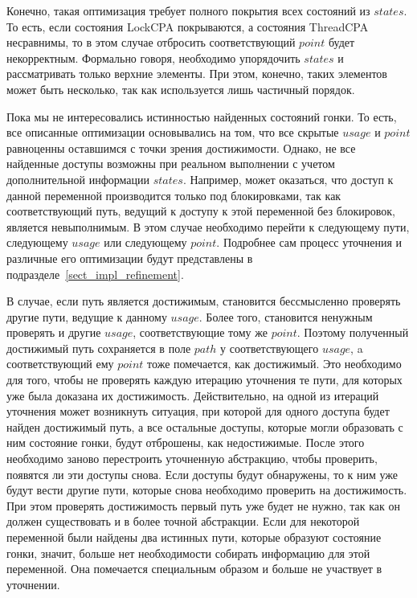 Конечно, такая оптимизация требует полного покрытия всех состояний из $states$.
То есть, если состояния LockCPA покрываются, а состояния ThreadCPA несравнимы, то в этом случае отбросить соответствующий $point$ будет некорректным.
Формально говоря, необходимо упорядочить $states$ и рассматривать только верхние элементы.
При этом, конечно, таких элементов может быть несколько, так как используется лишь частичный порядок.

Пока мы не интересовались истинностью найденных состояний гонки.
То есть, все описанные оптимизации основывались на том, что все скрытые $usage$ и $point$ равноценны оставшимся с точки зрения достижимости.
Однако, не все найденные доступы возможны при реальном выполнении с учетом дополнительной информации $states$.
Например, может оказаться, что доступ к данной переменной производится только под блокировками, так как соответствующий путь, ведущий к доступу к этой переменной без блокировок, является невыполнимым.
В этом случае необходимо перейти к следующему пути, следующему $usage$ или следующему $point$.
Подробнее сам процесс уточнения и различные его оптимизации будут представлены в подразделе~\ref{sect_impl_refinement}.

В случае, если путь является достижимым, становится бессмысленно проверять другие пути, ведущие к данному $usage$.
Более того, становится ненужным проверять и другие $usage$, соответствующие тому же $point$.
Поэтому полученный достижимый путь сохраняется в поле $path$ у соответствующего $usage$, a соответствующий ему $point$ тоже помечается, как достижимый.
Это необходимо для того, чтобы не проверять каждую итерацию уточнения те пути, для которых уже была доказана их достижимость.
Действительно, на одной из итераций уточнения может возникнуть ситуация, при которой для одного доступа будет найден достижимый путь, а все остальные доступы, которые могли образовать с ним состояние гонки, будут отброшены, как недостижимые.
После этого необходимо заново перестроить уточненную абстракцию, чтобы проверить, появятся ли эти доступы снова.
Если доступы будут обнаружены, то к ним уже будут вести другие пути, которые снова необходимо проверить на достижимость.
При этом проверять достижимость первый путь уже будет не нужно, так как он должен существовать и в более точной абстракции.
Если для некоторой переменной были найдены два истинных пути, которые образуют состояние гонки, значит, больше нет необходимости собирать информацию для этой переменной.
Она помечается специальным образом и больше не участвует в уточнении.

